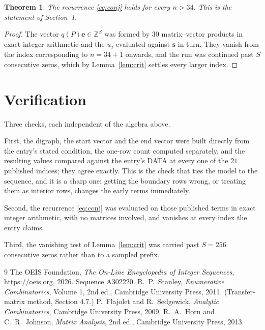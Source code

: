 \documentclass[11pt,a4paper]{article}
\theoremstyle{plain}
\newtheorem{theorem}{Theorem}
\theoremstyle{definition}
\begin{document}
\begin{theorem}
The recurrence \eqref{eq:conj} holds for every $n>34$. This is the statement of
Section~1.
\end{theorem}

\begin{proof}
The vector $q(P)\mathbf{e}\in\mathbb{Z}^{S}$ was formed by $30$ matrix--vector
products in exact integer arithmetic and the $u_j$ evaluated against $\mathbf{s}$ in turn.
They vanish from the index corresponding to $n=34+1$ onwards, and the run was continued
past $S$ consecutive zeros, which by Lemma~\ref{lem:crit} settles every larger index.
\end{proof}

\section{Verification}

Three checks, each independent of the algebra above.

First, the digraph, the start vector and the end vector were built directly from the
entry's stated condition, the one-row count computed separately, and the resulting values
compared against the entry's DATA at every one of the $21$ published indices; they
agree exactly. This is the check that ties the model to the sequence, and it is a sharp one:
getting the boundary rows wrong, or treating them as interior rows, changes the early terms
immediately.

Second, the recurrence \eqref{eq:conj} was evaluated on those published terms in exact
integer arithmetic, with no matrices involved, and vanishes at every index the entry claims.

Third, the vanishing test of Lemma~\ref{lem:crit} was carried past $S=256$ consecutive
zeros rather than to a sampled prefix.

\begin{thebibliography}{9}
 The OEIS Foundation, \emph{The On-Line Encyclopedia of Integer
Sequences}, \url{https://oeis.org}, 2026. Sequence A302220.
 R.~P.~Stanley, \emph{Enumerative Combinatorics}, Volume 1, 2nd ed.,
Cambridge University Press, 2011. (Transfer-matrix method, Section 4.7.)
 P.~Flajolet and R.~Sedgewick, \emph{Analytic Combinatorics}, Cambridge
University Press, 2009.
 R.~A.~Horn and C.~R.~Johnson, \emph{Matrix Analysis}, 2nd ed., Cambridge
University Press, 2013.
\end{thebibliography}
\end{document}
